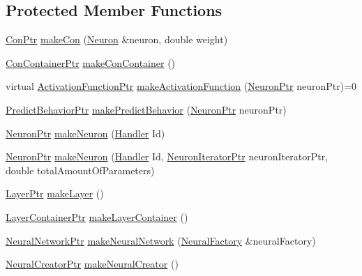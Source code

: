 \subsection*{Protected Member Functions}
\begin{DoxyCompactItemize}
\item 
\hyperlink{_a_m_o_r_e_8h_a169bb8e5f26ce70bf2b10dec2fb5ee50}{ConPtr} \hyperlink{class_m_l_pfactory_ac47beb4aced10b9c99414ba7dd7c8b55}{makeCon} (\hyperlink{class_neuron}{Neuron} \&neuron, double weight)
\item 
\hyperlink{_a_m_o_r_e_8h_a1021dbaf961d1c8da6d58a8566e5778b}{ConContainerPtr} \hyperlink{class_m_l_pfactory_a69562b8fd06c60a2d5db66d8b0f10299}{makeConContainer} ()
\item 
virtual \hyperlink{_a_m_o_r_e_8h_a77602a0277a02e5769c3df0adc669b17}{ActivationFunctionPtr} \hyperlink{class_m_l_pfactory_a92109ea285be7dd847d359a1ade9064a}{makeActivationFunction} (\hyperlink{_a_m_o_r_e_8h_ac1ea936c2c7728eb382278131652fef4}{NeuronPtr} neuronPtr)=0
\item 
\hyperlink{_a_m_o_r_e_8h_a1fb2f1f8fdf1e08c42ef4bdce436af93}{PredictBehaviorPtr} \hyperlink{class_m_l_pfactory_a9e9e9bb4390df09c78a24c4ff79cdab6}{makePredictBehavior} (\hyperlink{_a_m_o_r_e_8h_ac1ea936c2c7728eb382278131652fef4}{NeuronPtr} neuronPtr)
\item 
\hyperlink{_a_m_o_r_e_8h_ac1ea936c2c7728eb382278131652fef4}{NeuronPtr} \hyperlink{class_m_l_pfactory_a6dd50bc994fa69d7c4de183284efdae2}{makeNeuron} (\hyperlink{_a_m_o_r_e_8h_abc871abb71cff6655b8172ee7240b8ef}{Handler} Id)
\item 
\hyperlink{_a_m_o_r_e_8h_ac1ea936c2c7728eb382278131652fef4}{NeuronPtr} \hyperlink{class_m_l_pfactory_a9e3c7140a702a12d7a7fde8ad52b6b04}{makeNeuron} (\hyperlink{_a_m_o_r_e_8h_abc871abb71cff6655b8172ee7240b8ef}{Handler} Id, \hyperlink{_a_m_o_r_e_8h_aa794539c0a68e4eb451e7a2cc6294acc}{NeuronIteratorPtr} neuronIteratorPtr, double totalAmountOfParameters)
\item 
\hyperlink{_a_m_o_r_e_8h_acce4b66db3921b7326fbe1a04a56e5fc}{LayerPtr} \hyperlink{class_m_l_pfactory_ab67ef662094f7c74079d7d1af3d0a3ce}{makeLayer} ()
\item 
\hyperlink{_a_m_o_r_e_8h_af261b546158af61fc27686fb926961f2}{LayerContainerPtr} \hyperlink{class_m_l_pfactory_af12cd036035e6887869f22f4c5ecb497}{makeLayerContainer} ()
\item 
\hyperlink{_a_m_o_r_e_8h_a7adadf1c313313507b00cd1193db29a1}{NeuralNetworkPtr} \hyperlink{class_m_l_pfactory_abbedf3582eef72da1fdae1fd0a07a441}{makeNeuralNetwork} (\hyperlink{class_neural_factory}{NeuralFactory} \&neuralFactory)
\item 
\hyperlink{_a_m_o_r_e_8h_aefebabe3353f684b7708712480c15699}{NeuralCreatorPtr} \hyperlink{class_m_l_pfactory_ab71df59a90f1f32abdd52ff8b3f6fe7a}{makeNeuralCreator} ()
\end{DoxyCompactItemize}


